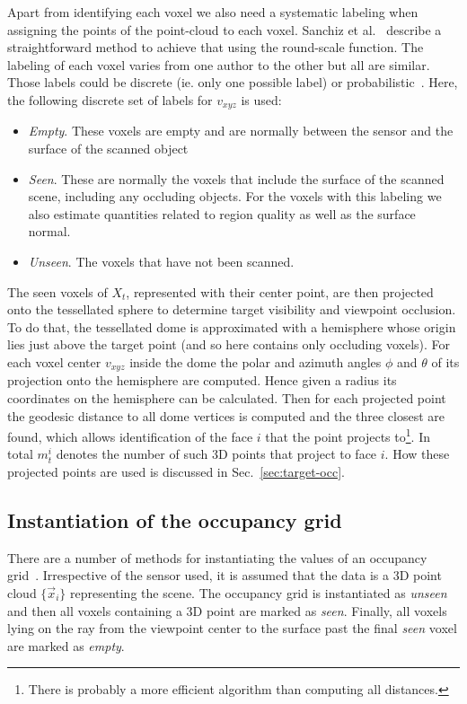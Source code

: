 \documentclass[10pt,twocolumn,letterpaper]{article}
\begin{document}
Apart from identifying each voxel we also need a systematic labeling when assigning the points of the point-cloud to each voxel. 
Sanchiz et al.~\cite{Sanchiz1999} describe a straightforward method to achieve that using the round-scale function. 
The labeling of each voxel varies from one author to the other but all are similar. 
Those labels could be discrete (ie. only one possible label) or probabilistic~\cite{Hornung2013}.
Here, the following discrete set of labels for $v_{xyz}$ is used:
\begin{itemize}
  \item \textit{Empty}. These voxels are empty and are normally between the sensor and the surface of the scanned object
  \item \textit{Seen}. These are normally the voxels that include the surface of the scanned scene, including any occluding objects. For the voxels with this labeling we also estimate quantities related to region quality as well as the surface normal.
  \item \textit{Unseen}. The voxels that have not been scanned.
\end{itemize}
The seen voxels of $X_t$, represented with their center point, are then projected onto the tessellated sphere to determine target visibility and viewpoint occlusion. 
To do that, the tessellated dome is approximated with a hemisphere whose origin lies just above the target point (and so here contains only occluding voxels). 
For each voxel center $v_{xyz}$ inside the dome the polar and azimuth angles $\phi$ and $\theta$ of its projection onto the hemisphere are computed. 
Hence given a radius its coordinates on the hemisphere can be calculated. 
Then for each projected point the geodesic distance to all dome vertices is computed and the three closest are found, which allows identification of the face $i$ that the point projects to\footnote{There is probably a more efficient algorithm than computing all distances.}. 
In total $m^i_t$ denotes the number of such 3D points that project to face $i$.
How these projected points are used is discussed in Sec.~\ref{sec:target-occ}.

\subsection{Instantiation of the occupancy grid}

There are a number of methods for instantiating the values of an occupancy grid~\cite{Hornung2013}.
Irrespective of the sensor used, it is assumed that the data is a 3D point cloud $\{\vec{x}_i\}$ representing the scene.
The occupancy grid is instantiated as \textit{unseen} and then all voxels containing a 3D point are marked as \textit{seen}.
Finally, all voxels lying on the ray from the viewpoint center to the surface past the final \textit{seen} voxel are marked as \textit{empty}.
\end{document}
